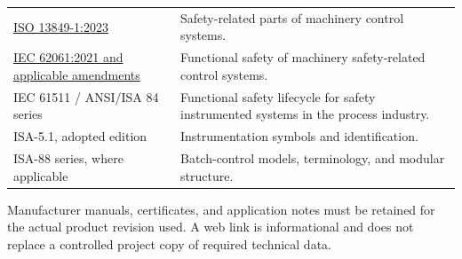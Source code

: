 \begin{longtable}{@{}P{5.27cm}P{10.79cm}@{}}
\href{https://www.iso.org/standard/73481.html}{ISO 13849-1:2023} & Safety-related parts of machinery control systems.\\
\href{https://webstore.iec.ch/en/publication/59927}{IEC 62061:2021 and applicable amendments} & Functional safety of machinery safety-related control systems.\\
IEC 61511 / ANSI/ISA 84 series & Functional safety lifecycle for safety instrumented systems in the process industry.\\
ISA-5.1, adopted edition & Instrumentation symbols and identification.\\
ISA-88 series, where applicable & Batch-control models, terminology, and modular structure.\\
\bottomrule
\end{longtable}

Manufacturer manuals, certificates, and application notes must be retained for the actual product revision used. A web link is informational and does not replace a controlled project copy of required technical data.
